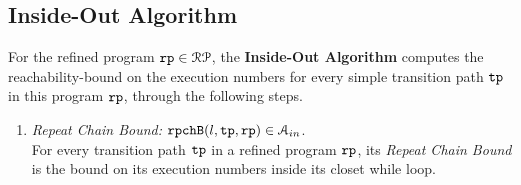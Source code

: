 \subsection{Inside-Out Algorithm}
\label{sec:inoutalg}
For the refined program ${\mathtt{rp}} \in \mathcal{RP}$, the \textbf{Inside-Out Algorithm}
computes the reachability-bound on the execution numbers for every simple transition path ${\mathtt{tp}}$ in this program ${\mathtt{rp}}$,
through the following steps.
%
\begin{enumerate}
  \item \emph{Repeat Chain Bound:} ${\mathtt{rpchB}}(l, {\mathtt{tp}}, {\mathtt{rp}}) \in \mathcal{A}_{in}$.
  \\
  For every transition path ${\mathtt{tp}}$ in a refined program ${\mathtt{rp}}$,
  its \emph{Repeat Chain Bound} is the
  bound on its execution numbers inside its closet while loop.


\end{enumerate}

